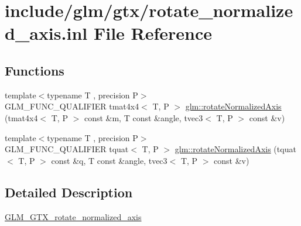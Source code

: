 \hypertarget{rotate__normalized__axis_8inl}{}\section{include/glm/gtx/rotate\+\_\+normalized\+\_\+axis.inl File Reference}
\label{rotate__normalized__axis_8inl}
\subsection*{Functions}
\begin{DoxyCompactItemize}
\item 
{\footnotesize template$<$typename T , precision P$>$ }\\G\+L\+M\+\_\+\+F\+U\+N\+C\+\_\+\+Q\+U\+A\+L\+I\+F\+I\+ER tmat4x4$<$ T, P $>$ \hyperlink{group__gtx__rotate__normalized__axis_gaada623964a895def5a8b77b5b7887dc4}{glm\+::rotate\+Normalized\+Axis} (tmat4x4$<$ T, P $>$ const \&m, T const \&angle, tvec3$<$ T, P $>$ const \&v)
\item 
{\footnotesize template$<$typename T , precision P$>$ }\\G\+L\+M\+\_\+\+F\+U\+N\+C\+\_\+\+Q\+U\+A\+L\+I\+F\+I\+ER tquat$<$ T, P $>$ \hyperlink{group__gtx__rotate__normalized__axis_ga6c00234d844faef36a6a94669fbd1639}{glm\+::rotate\+Normalized\+Axis} (tquat$<$ T, P $>$ const \&q, T const \&angle, tvec3$<$ T, P $>$ const \&v)
\end{DoxyCompactItemize}


\subsection{Detailed Description}
\hyperlink{group__gtx__rotate__normalized__axis}{G\+L\+M\+\_\+\+G\+T\+X\+\_\+rotate\+\_\+normalized\+\_\+axis} 